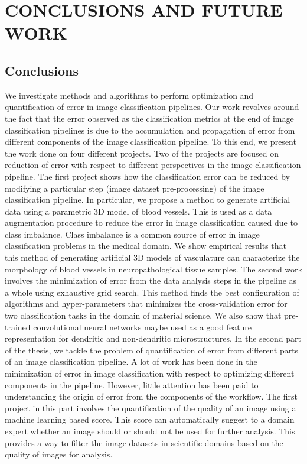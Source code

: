 \chapter{CONCLUSIONS AND FUTURE WORK}
\label{chap:conclusions}
\section{Conclusions}
We investigate methods and algorithms to perform optimization and quantification of error in image classification pipelines. Our work revolves around the fact that the error observed as the classification metrics at the end of image classification pipelines is due to the accumulation and propagation of error from different components of the image classification pipeline. To this end, we present the work done on four different projects. Two of the projects are focused on reduction of error with respect to different perspectives in the image classification pipeline. 
The first project shows how the classification error can be reduced by modifying a particular step (image dataset pre-processing) of the image classification pipeline. In particular, we propose a method to generate artificial data using a parametric 3D model of blood vessels. This is used as a data augmentation procedure to reduce the error in image classification caused due to class imbalance. Class imbalance is a common source of error in image classification problems in the medical domain. We show empirical results that this method of generating artificial 3D models of vasculature can characterize the morphology of blood vessels in neuropathological tissue samples.  
The second work involves the minimization of error from the data analysis steps in the pipeline as a whole using exhaustive grid search. This method finds the best configuration of algorithms and hyper-parameters that minimizes the cross-validation error for two classification tasks in the domain of material science. We also show that pre-trained convolutional neural networks maybe used  as a good feature representation for dendritic and non-dendritic microstructures. 
In the second part of the thesis, we tackle the problem of quantification of error from different parts of an image classification pipeline. A lot of work has been done in the minimization of error in image classification with respect to optimizing different components in the pipeline. However, little attention has been paid to understanding the origin of error from the components of the workflow. 
The first project in this part involves the quantification of the quality of an image using a machine learning based score. This score can automatically suggest to a domain expert whether an image should or should not be used for further analysis. This provides a way to filter the image datasets in scientific domains based on the quality of images for analysis.
